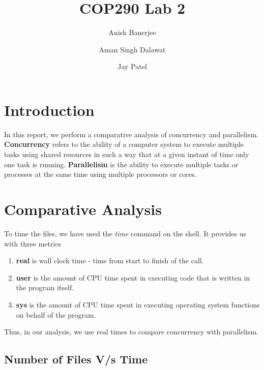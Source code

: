 \documentclass[english, 12pt]{article}
\begin{document}
\title{COP290 Lab 2}

\author{
  Anish Banerjee  \and
  Aman Singh Dalawat \and
  Jay Patel 
}

\maketitle

\section{Introduction}\label{introduction}
In this report, we perform a comparative analysis of concurrency and parallelism. \textbf{Concurrency} refers to the ability of a computer system to execute multiple tasks using shared resources in such a way that at a given instant of time only one task is running. \textbf{Parallelism} is the ability to execute multiple tasks or processes at the same time using multiple processors or cores.
 


\section{Comparative Analysis}
To time the files, we have used the \textit{time} command on the shell. It provides us with three metrics
\begin{enumerate}
\item{\textbf{real} is wall clock time - time from start to finish of the call.}
\item{\textbf{user} is the amount of CPU time spent in executing code that is written in the program itself.}
\item{\textbf{sys} is the amount of CPU time spent in executing operating system functions on behalf of the program. }
\end{enumerate}

Thus, in our analysis, we use real times to compare concurrency with parallelism.

\subsection{Number of Files V/s Time}
\end{document}
